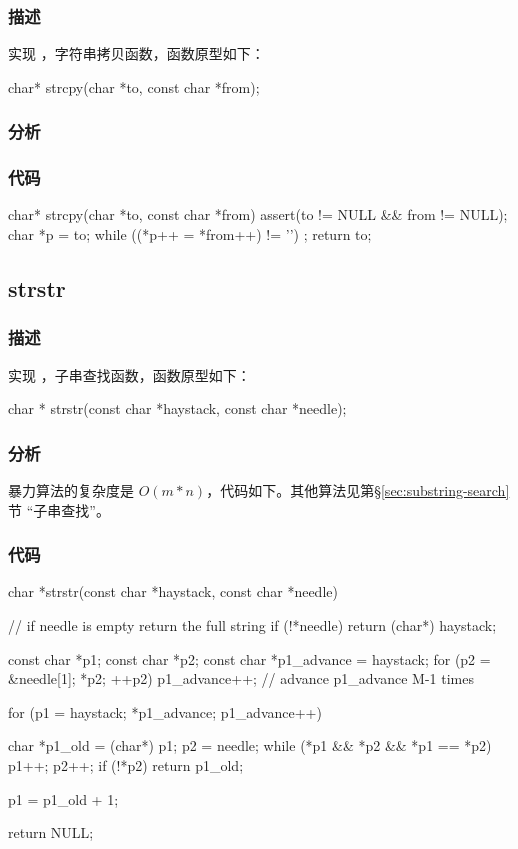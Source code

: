 \subsubsection{描述}
实现 ，字符串拷贝函数，函数原型如下：
\begin{Code}
char* strcpy(char *to, const char *from);
\end{Code}


\subsubsection{分析}



\subsubsection{代码}
\begin{Code}
char* strcpy(char *to, const char *from) {
    assert(to != NULL && from != NULL);
    char *p = to;
    while ((*p++ = *from++) != '\0')
        ;
    return to;
}
\end{Code}


\subsection{strstr}


\subsubsection{描述}
实现 ，子串查找函数，函数原型如下：
\begin{Code}
char * strstr(const char *haystack, const char *needle);
\end{Code}


\subsubsection{分析}
暴力算法的复杂度是 $O(m*n)$，代码如下。其他算法见第\S \ref{sec:substring-search}节 
“子串查找”。


\subsubsection{代码}
\begin{Code}
char *strstr(const char *haystack, const char *needle) {
    // if needle is empty return the full string
    if (!*needle) return (char*) haystack;

    const char *p1;
    const char *p2;
    const char *p1_advance = haystack;
    for (p2 = &needle[1]; *p2; ++p2) {
        p1_advance++;   // advance p1_advance M-1 times
    }

    for (p1 = haystack; *p1_advance; p1_advance++) {
        char *p1_old = (char*) p1;
        p2 = needle;
        while (*p1 && *p2 && *p1 == *p2) {
            p1++;
            p2++;
        }
        if (!*p2) return p1_old;

        p1 = p1_old + 1;
    }
    return NULL;
}
\end{Code}


